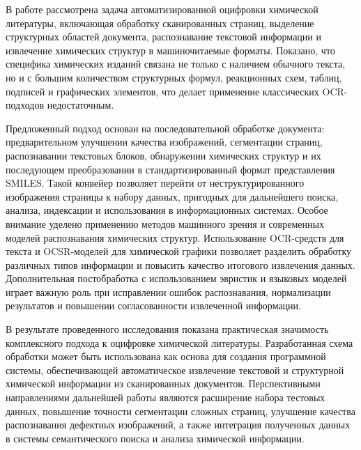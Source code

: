 В работе рассмотрена задача автоматизированной оцифровки химической литературы, включающая обработку сканированных страниц, выделение структурных областей документа, распознавание текстовой информации и извлечение химических структур в машиночитаемые форматы. Показано, что специфика химических изданий связана не только с наличием обычного текста, но и с большим количеством структурных формул, реакционных схем, таблиц, подписей и графических элементов, что делает применение классических OCR-подходов недостаточным.

Предложенный подход основан на последовательной обработке документа: предварительном улучшении качества изображений, сегментации страниц, распознавании текстовых блоков, обнаружении химических структур и их последующем преобразовании в стандартизированный формат представления SMILES. Такой конвейер позволяет перейти от неструктурированного изображения страницы к набору данных, пригодных для дальнейшего поиска, анализа, индексации и использования в информационных системах.
Особое внимание уделено применению методов машинного зрения и современных моделей распознавания химических структур. Использование OCR-средств для текста и OCSR-моделей для химической графики позволяет разделить обработку различных типов информации и повысить качество итогового извлечения данных. Дополнительная постобработка с использованием эвристик и языковых моделей играет важную роль при исправлении ошибок распознавания, нормализации результатов и повышении согласованности извлеченной информации.

В результате проведенного исследования показана практическая значимость комплексного подхода к оцифровке химической литературы. Разработанная схема обработки может быть использована как основа для создания программной системы, обеспечивающей автоматическое извлечение текстовой и структурной химической информации из сканированных документов. Перспективными направлениями дальнейшей работы являются расширение набора тестовых данных, повышение точности сегментации сложных страниц, улучшение качества распознавания дефектных изображений, а также интеграция полученных данных в системы семантического поиска и анализа химической информации.